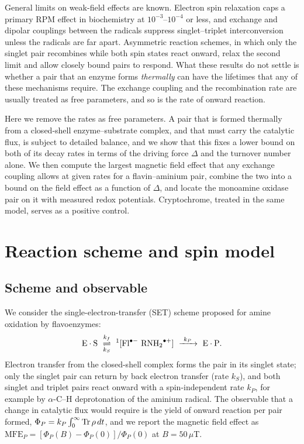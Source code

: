 \documentclass[journal=jpcbfk,manuscript=article,layout=traditional]{achemso}
\begin{document}
General limits on weak-field effects are known. Electron spin relaxation caps a
primary RPM effect in biochemistry at $10^{-3}$--$10^{-4}$ or
less,\cite{Binhi2025} and exchange and dipolar couplings between the radicals
suppress singlet--triplet interconversion unless the radicals are far
apart.\cite{Efimova2008} Asymmetric reaction schemes, in which only the singlet
pair recombines while both spin states react onward, relax the second limit and
allow closely bound pairs to respond.\cite{Denton2024} What these results do not
settle is whether a pair that an enzyme forms \emph{thermally} can have the
lifetimes that any of these mechanisms require. The exchange coupling and the
recombination rate are usually treated as free parameters, and so is the rate
of onward reaction.

Here we remove the rates as free parameters. A pair that is formed thermally
from a closed-shell enzyme--substrate complex, and that must carry the catalytic
flux, is subject to detailed balance, and we show that this fixes a lower bound
on both of its decay rates in terms of the driving force $\Delta$ and the
turnover number alone. We then compute the largest magnetic field effect that
any exchange coupling allows at given rates for a flavin--aminium pair, combine
the two into a bound on the field effect as a function of $\Delta$, and locate
the monoamine oxidase pair on it with measured redox potentials. Cryptochrome,
treated in the same model, serves as a positive control.

\section{Reaction scheme and spin model}

\subsection{Scheme and observable}

We consider the single-electron-transfer (SET) scheme proposed for amine
oxidation by flavoenzymes:\cite{Edmondson2007}
\begin{equation}
{\rm E\cdot S}\ \underset{k_S}{\overset{k_f}{\rightleftharpoons}}\
{}^1[{\rm Fl}^{\bullet-}\ {\rm RNH_2}^{\bullet+}]
\ \xrightarrow{\ k_P\ }\ {\rm E\cdot P}.
\label{eq:scheme}
\end{equation}
Electron transfer from the closed-shell complex forms the pair in its singlet
state; only the singlet pair can return by back electron transfer (rate $k_S$),
and both singlet and triplet pairs react onward with a spin-independent rate
$k_P$, for example by $\alpha$-C--H deprotonation of the aminium radical. The
observable that a change in catalytic flux would require is the yield of
onward reaction per pair formed, $\Phi_P = k_P\int_0^\infty{\rm Tr}\,\rho\,dt$,
and we report the magnetic field effect as
$\mathrm{MFE}_P = [\Phi_P(B)-\Phi_P(0)]/\Phi_P(0)$ at $B=50\,\mu$T.
\end{document}
